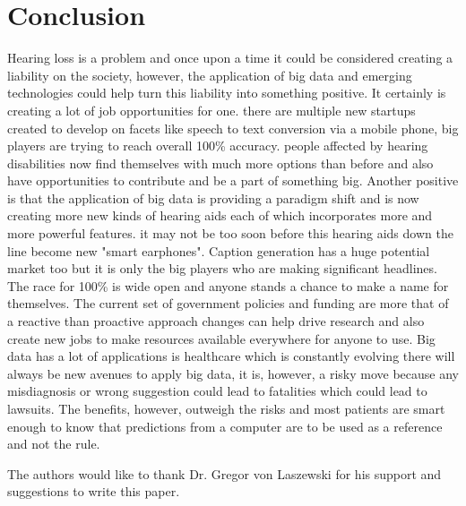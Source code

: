 \documentclass[sigconf]{acmart}
\begin{document}
\section{Conclusion}
Hearing loss is a problem and once upon a time it could be considered creating a liability on the society, however, the application of big data and emerging technologies could help turn this liability into something positive. It certainly is creating a lot of job opportunities for one. there are multiple new startups created to develop on facets like speech to text conversion via a mobile phone, big players are trying to reach overall 100\% accuracy. people affected by hearing disabilities now find themselves with much more options than before and also have opportunities to contribute and be a part of something big. Another positive is that the application of big data is providing a paradigm shift and is now creating more new kinds of hearing aids each of which incorporates more and more powerful features. it may not be too soon before this hearing aids down the line become new "smart earphones". Caption generation has a huge potential market too but it is only the big players who are making significant headlines. The race for 100\% is wide open and anyone stands a chance to make a name for themselves. The current set of government policies and funding are more that of a reactive than proactive approach changes can help drive research and also create new jobs to make resources available everywhere for anyone to use. Big data has a lot of applications is healthcare which is constantly evolving there will always be new avenues to apply big data, it is, however, a risky move because any misdiagnosis or wrong suggestion could lead to fatalities which could lead to lawsuits. The benefits, however, outweigh the risks and most patients are smart enough to know that predictions from a computer are to be used as a reference and not the rule.



\begin{acks}

  The authors would like to thank Dr. Gregor von Laszewski for his support and suggestions to write this paper.

\end{acks}


 
\end{document}

